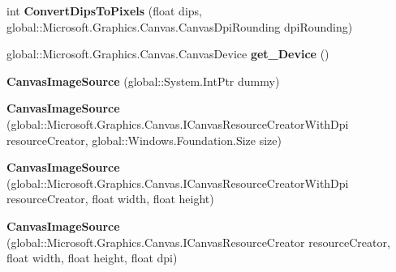 \begin{DoxyCompactItemize}
int {\bfseries Convert\+Dips\+To\+Pixels} (float dips, global\+::\+Microsoft.\+Graphics.\+Canvas.\+Canvas\+Dpi\+Rounding dpi\+Rounding)
\item 
\mbox{\label{class_microsoft_1_1_graphics_1_1_canvas_1_1_u_i_1_1_xaml_1_1_canvas_image_source_aab3581e1ce35b89a948dc0025e5aaa14}} 
global\+::\+Microsoft.\+Graphics.\+Canvas.\+Canvas\+Device {\bfseries get\+\_\+\+Device} ()
\item 
\mbox{\label{class_microsoft_1_1_graphics_1_1_canvas_1_1_u_i_1_1_xaml_1_1_canvas_image_source_a274b866a61b2dc07e5c6c8ab2510ac87}} 
{\bfseries Canvas\+Image\+Source} (global\+::\+System.\+Int\+Ptr dummy)
\item 
\mbox{\label{class_microsoft_1_1_graphics_1_1_canvas_1_1_u_i_1_1_xaml_1_1_canvas_image_source_a9eb6e499e761bca49e7066fd004cac4a}} 
{\bfseries Canvas\+Image\+Source} (global\+::\+Microsoft.\+Graphics.\+Canvas.\+I\+Canvas\+Resource\+Creator\+With\+Dpi resource\+Creator, global\+::\+Windows.\+Foundation.\+Size size)
\item 
\mbox{\label{class_microsoft_1_1_graphics_1_1_canvas_1_1_u_i_1_1_xaml_1_1_canvas_image_source_a59470b76c2a432e8d723603569f5e5bf}} 
{\bfseries Canvas\+Image\+Source} (global\+::\+Microsoft.\+Graphics.\+Canvas.\+I\+Canvas\+Resource\+Creator\+With\+Dpi resource\+Creator, float width, float height)
\item 
\mbox{\label{class_microsoft_1_1_graphics_1_1_canvas_1_1_u_i_1_1_xaml_1_1_canvas_image_source_a879541668a8b03ad33dddb352363a22b}} 
{\bfseries Canvas\+Image\+Source} (global\+::\+Microsoft.\+Graphics.\+Canvas.\+I\+Canvas\+Resource\+Creator resource\+Creator, float width, float height, float dpi)
\item 
\mbox{\label{class_microsoft_1_1_graphics_1_1_canvas_1_1_u_i_1_1_xaml_1_1_canvas_image_source_af7653cd38e9fa993c395e9aab7f32134}} 

\end{DoxyCompactItemize}
